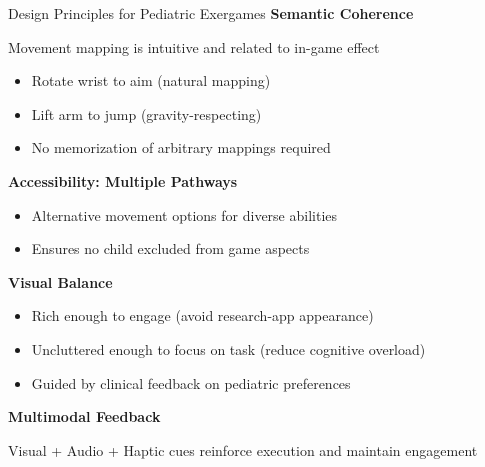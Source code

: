 \begin{frame}{Design Principles for Pediatric Exergames}
	\textbf{\textcolor{gbAqua}{Semantic Coherence}}
	
	Movement mapping is intuitive and related to in-game effect
	\begin{itemize}
		\item Rotate wrist to aim (natural mapping)
		\item Lift arm to jump (gravity-respecting)
		\item No memorization of arbitrary mappings required
	\end{itemize}
	
	\vspace{0.2cm}
	
	\textbf{\textcolor{gbAqua}{Accessibility: Multiple Pathways}}
	
	\begin{itemize}
		\item Alternative movement options for diverse abilities
		\item Ensures no child excluded from game aspects
	\end{itemize}
	
	\vspace{0.2cm}
	
	\textbf{\textcolor{gbAqua}{Visual Balance}}
	
	\begin{itemize}
		\item Rich enough to engage (avoid research-app appearance)
		\item Uncluttered enough to focus on task (reduce cognitive overload)
		\item Guided by clinical feedback on pediatric preferences
	\end{itemize}
	
	\vspace{0.2cm}
	
	\textbf{\textcolor{gbAqua}{Multimodal Feedback}}
	
	Visual + Audio + Haptic cues reinforce execution and maintain engagement
\end{frame}


